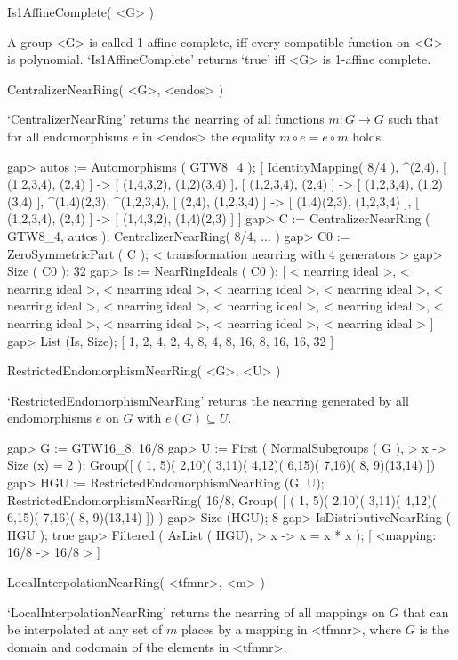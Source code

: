 \>Is1AffineComplete( <G> )

A group <G> is called 1-affine complete, iff every compatible function on <G> is
polynomial. `Is1AffineComplete' returns `true' iff <G> is 1-affine complete.

\>CentralizerNearRing( <G>, <endos> )

`CentralizerNearRing' returns the nearring of all functions
$m:G \rightarrow G$ such that for all endomorphisms $e$ in <endos> the
equality $m \circ e = e \circ m$ holds.

\beginexample
    gap> autos := Automorphisms ( GTW8_4 );
    [ IdentityMapping( 8/4 ), ^(2,4), 
      [ (1,2,3,4), (2,4) ] -> [ (1,4,3,2), (1,2)(3,4) ], 
      [ (1,2,3,4), (2,4) ] -> [ (1,2,3,4), (1,2)(3,4) ], ^(1,4)(2,3), 
      ^(1,2,3,4), [ (2,4), (1,2,3,4) ] -> [ (1,4)(2,3), (1,2,3,4) ], 
      [ (1,2,3,4), (2,4) ] -> [ (1,4,3,2), (1,4)(2,3) ] ]
    gap> C := CentralizerNearRing ( GTW8_4, autos );
    CentralizerNearRing( 8/4, ... )
    gap> C0 := ZeroSymmetricPart ( C );
    < transformation nearring with 4 generators >
    gap> Size ( C0 );
    32
    gap> Is := NearRingIdeals ( C0 );
    [ < nearring ideal >, < nearring ideal >, < nearring ideal >, 
      < nearring ideal >, < nearring ideal >, < nearring ideal >, 
      < nearring ideal >, < nearring ideal >, < nearring ideal >, 
      < nearring ideal >, < nearring ideal >, < nearring ideal >, 
      < nearring ideal > ]
    gap> List (Is, Size);
    [ 1, 2, 4, 2, 4, 8, 4, 8, 16, 8, 16, 16, 32 ]
\endexample

\>RestrictedEndomorphismNearRing( <G>, <U> )

`RestrictedEndomorphismNearRing' returns the nearring generated by all
endomorphisms $e$ on $G$ with $e(G) \subseteq U$.

\beginexample
    gap> G := GTW16_8;
    16/8
    gap> U := First ( NormalSubgroups ( G ),
    >              x -> Size (x) = 2 );
    Group([ ( 1, 5)( 2,10)( 3,11)( 4,12)( 6,15)( 7,16)( 8, 9)(13,14) ])
    gap> HGU := RestrictedEndomorphismNearRing (G, U);
    RestrictedEndomorphismNearRing( 16/8, Group(
    [ ( 1, 5)( 2,10)( 3,11)( 4,12)( 6,15)( 7,16)( 8, 9)(13,14) ]) )
    gap> Size (HGU);
    8
    gap> IsDistributiveNearRing ( HGU );
    true
    gap> Filtered ( AsList ( HGU),
    >       x -> x = x * x );
    [ <mapping: 16/8 -> 16/8 > ]
\endexample
 
\>LocalInterpolationNearRing( <tfmnr>, <m> )

`LocalInterpolationNearRing' returns the nearring of all mappings on
$G$ that can be interpolated at any set of $m$ places by a mapping in
<tfmnr>, where $G$ is the domain and codomain of the elements in
<tfmnr>.

